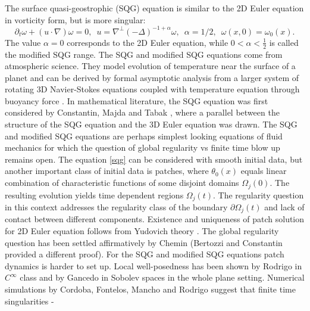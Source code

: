 \documentclass[reqno,centertags, 11pt]{amsart}
\begin{document}
The surface quasi-geostrophic (SQG) equation is similar to the 2D Euler equation in vorticity form, but is more singular:
\begin{equation}\label{sqg} \partial_t \omega + (u \cdot \nabla) \omega =0, \,\,\, u = \nabla^\perp (-\Delta)^{-1+\alpha}\omega, \,\,\,\alpha=1/2,\,\,\,\omega(x,0)=\omega_0(x). \end{equation}
The value $\alpha=0$ corresponds to the 2D Euler equation, while $0 < \alpha < \frac12$ is called the modified SQG range. The SQG and modified SQG equations come from atmospheric science.
They model evolution of temperature near the surface of a planet and can be derived by formal asymptotic analysis from a larger system of rotating 3D Navier-Stokes equations
coupled with temperature equation through buoyancy force \cite{Held,Majda,Ped,PHS}. In mathematical literature, the SQG equation was first considered by Constantin, Majda and Tabak
\cite{CMT}, where a parallel between the structure of the SQG equation and the 3D Euler equation was drawn. The SQG and modified SQG equations are perhaps simplest looking equations
of fluid mechanics for which the question of global regularity vs finite time blow up remains open. The equation \eqref{sqg} can be considered with smooth initial data, but another important
class of initial data is patches, where $\theta_0(x)$ equals linear combination of characteristic functions of some disjoint domains $\Omega_j(0).$ The resulting evolution yields time
dependent regions $\Omega_j(t)$.
The regularity question in this context addresses the regularity class of the boundary $\partial \Omega_j(t)$ and lack of contact between different components.
Existence and uniqueness of patch solution for 2D Euler equation
follows from Yudovich theory \cite{Yudth,MB,MP}.
The global regularity question has been settled affirmatively by Chemin \cite{c} %
(Bertozzi and Constantin \cite{bc} provided a different proof). For the SQG and modified SQG equations patch dynamics is harder to set up.
Local well-posedness has been shown by Rodrigo in $C^\infty$ class \cite{Rodrigo} and by Gancedo in Sobolev spaces \cite{g} in the whole plane setting.
Numerical simulations by Cordoba, Fontelos, Mancho and Rodrigo \cite{CFMR} suggest that finite time singularities -
\end{document}
